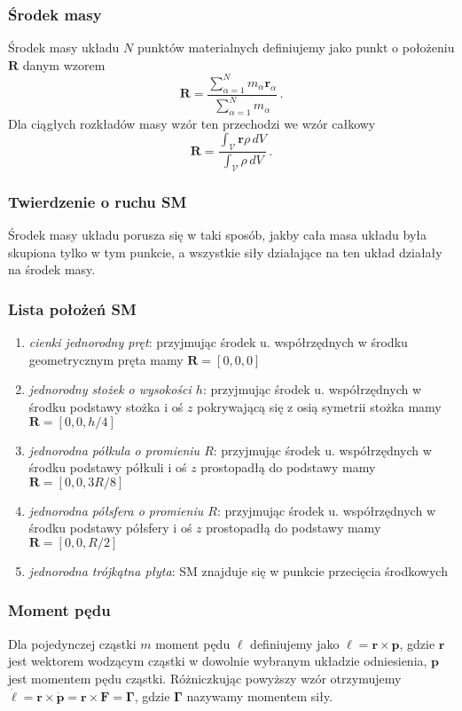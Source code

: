 \documentclass[../main.tex]{subfiles}
\begin{document}
\subsubsection{Środek masy}
Środek masy układu \(N\) punktów materialnych definiujemy jako punkt o położeniu \(\mathbf{R}\) danym wzorem
\begin{equation*}
    \mathbf{R}=\frac{\sum_{\alpha=1}^Nm_\alpha\mathbf{r}_\alpha}{\sum_{\alpha=1}^Nm_\alpha}\,.
\end{equation*}
Dla ciągłych rozkładów masy wzór ten przechodzi we wzór całkowy
\begin{equation*}
    \mathbf{R}=\frac{\int_{\mathcal{V}} \mathbf{r}\rho\,dV}{\int_{\mathcal{V}} \rho\,dV}\,.
\end{equation*}
\subsubsection*{Twierdzenie o ruchu SM}
Środek masy układu porusza się w taki sposób, jakby cała masa układu była skupiona tylko w tym punkcie, a wszystkie siły działające na ten układ działały na środek masy.

\subsubsection*{Lista położeń SM}

\begin{enumerate}
    \item \textit{cienki jednorodny pręt}: przyjmując środek u. współrzędnych w środku geometrycznym pręta mamy \(\mathbf{R}=[0,0,0]\)
    \item \textit{jednorodny stożek o wysokości \(h\)}: przyjmując środek u. współrzędnych w środku podstawy stożka i oś \(z\) pokrywającą się z osią symetrii stożka mamy \(\mathbf{R}=[0,0,h/4]\)
    \item \textit{jednorodna półkula o promieniu \(R\)}: przyjmując środek u. współrzędnych w środku podstawy półkuli i oś \(z\) prostopadłą do podstawy mamy \(\mathbf{R}=[0,0,3R/8]\)
    \item \textit{jednorodna półsfera o promieniu \(R\)}: przyjmując środek u. współrzędnych w środku podstawy półsfery i oś \(z\) prostopadłą do podstawy mamy \(\mathbf{R}=[0,0,R/2]\)
    \item \textit{jednorodna trójkątna płyta}: SM znajduje się w punkcie przecięcia środkowych
\end{enumerate}
\subsubsection{Moment pędu}
Dla pojedynczej cząstki \(m\) moment pędu \(\boldsymbol\ell\) definiujemy jako \(\boldsymbol{\ell}=\mathbf{r}\times\mathbf{p}\), gdzie \(\mathbf{r}\) jest wektorem wodzącym cząstki w dowolnie wybranym układzie odniesienia, \(\mathbf{p}\) jest momentem pędu cząstki. Różniczkując powyższy wzór otrzymujemy \(\dot{\boldsymbol{\ell}}=\mathbf{r}\times\dot{\mathbf{p}}=\mathbf{r}\times\mathbf{F}=\boldsymbol{\Gamma}\), gdzie \(\boldsymbol{\Gamma}\) nazywamy momentem siły.
\end{document}
